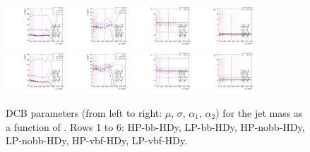 \begin{figure}[htbp]
  \includegraphics[width=0.2\textwidth]{fig/analysisAppendix/paramSignalShape_allSig_MJJ_HP_vbf_HDy_mean.pdf}
  \includegraphics[width=0.2\textwidth]{fig/analysisAppendix/paramSignalShape_allSig_MJJ_HP_vbf_HDy_sigma.pdf}
  \includegraphics[width=0.2\textwidth]{fig/analysisAppendix/paramSignalShape_allSig_MJJ_HP_vbf_HDy_alpha.pdf}
  \includegraphics[width=0.2\textwidth]{fig/analysisAppendix/paramSignalShape_allSig_MJJ_HP_vbf_HDy_alpha2.pdf}\\
  \includegraphics[width=0.2\textwidth]{fig/analysisAppendix/paramSignalShape_allSig_MJJ_LP_vbf_HDy_mean.pdf}
  \includegraphics[width=0.2\textwidth]{fig/analysisAppendix/paramSignalShape_allSig_MJJ_LP_vbf_HDy_sigma.pdf}
  \includegraphics[width=0.2\textwidth]{fig/analysisAppendix/paramSignalShape_allSig_MJJ_LP_vbf_HDy_alpha.pdf}
  \includegraphics[width=0.2\textwidth]{fig/analysisAppendix/paramSignalShape_allSig_MJJ_LP_vbf_HDy_alpha2.pdf}\\
  \caption{
    DCB parameters (from left to right: $\mu$, $\sigma$, $\alpha_1$, $\alpha_2$) for the jet mass \MJ as a function of \MX.
    Rows 1 to 6: HP-bb-HDy, LP-bb-HDy, HP-nobb-HDy, LP-nobb-HDy, HP-vbf-HDy, LP-vbf-HDy.
  }
  \label{fig:MJJShapeParam_HDy}
\end{figure}

